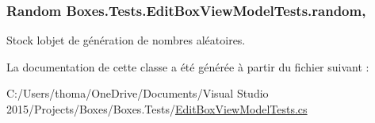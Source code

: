 \subsubsection[{\texorpdfstring{random}{random}}]{\setlength{\rightskip}{0pt plus 5cm}Random Boxes.\+Tests.\+Edit\+Box\+View\+Model\+Tests.\+random\hspace{0.3cm}{\ttfamily [static]}, {\ttfamily [private]}}\hypertarget{class_boxes_1_1_tests_1_1_edit_box_view_model_tests_a7c60410636b006143c6bd7fcf2107fd9}{}\label{class_boxes_1_1_tests_1_1_edit_box_view_model_tests_a7c60410636b006143c6bd7fcf2107fd9}


Stock l\textquotesingle{}objet de génération de nombres aléatoires. 



La documentation de cette classe a été générée à partir du fichier suivant \+:\begin{DoxyCompactItemize}
\item 
C\+:/\+Users/thoma/\+One\+Drive/\+Documents/\+Visual Studio 2015/\+Projects/\+Boxes/\+Boxes.\+Tests/\hyperlink{_edit_box_view_model_tests_8cs}{Edit\+Box\+View\+Model\+Tests.\+cs}\end{DoxyCompactItemize}
